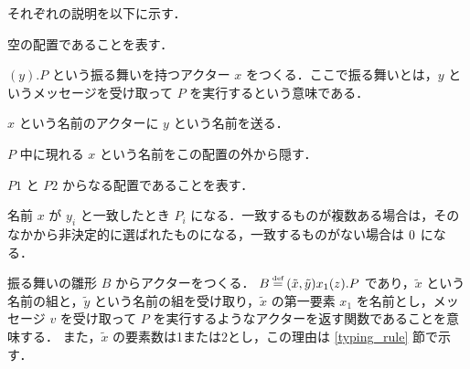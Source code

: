 

それぞれの説明を以下に示す．

\begin{description}[style=nextline,leftmargin=50pt]
  \item[$\nilconf$]
    空の配置であることを表す．
  \item[$\actorconf{x}{y}{P}$]
    $(y).P$ という振る舞いを持つアクター $x$ をつくる．ここで振る舞いとは，$y$ というメッセージを受け取って $P$ を実行するという意味である．
  \item[$\sendconf{x}{y}$]
    $x$ という名前のアクターに $y$ という名前を送る．
  \item[$\restrictconf{x}{P}$]
    $P$ 中に現れる $x$ という名前をこの配置の外から隠す．
  \item[$\composeconf{P1}{P2}$]
    $P1$ と $P2$ からなる配置であることを表す．
  \item[$\caseconf{x}{y_1 : P_1 ,..., y_n : P_n}$]
    名前 $x$ が $y_i$ と一致したとき $P_i$ になる．一致するものが複数ある場合は，そのなかから非決定的に選ばれたものになる，一致するものがない場合は $\nilconf$ になる．
  \item[$\behaviorconf{\tilde{x}}{\tilde{y}}$]
    振る舞いの雛形 $B$ からアクターをつくる．
    $B \defeq \behaviortemplate{\tilde{x}}{\tilde{y}}{x_1}{z}{P}$ であり，$\tilde{x}$ という名前の組と，$\tilde{y}$ という名前の組を受け取り，$\tilde{x}$ の第一要素 $x_1$ を名前とし，メッセージ $v$ を受け取って $P$ を実行するようなアクターを返す関数であることを意味する．
    また，$\tilde{x}$ の要素数は1または2とし，この理由は \ref{typing_rule} 節で示す．
\end{description}


